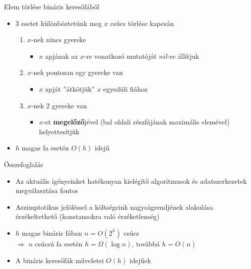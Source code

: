 \documentclass{beamer}
\begin{document}
\begin{frame}{Elem törlése bináris keresőfából}
\pause
	\begin{itemize}
		\item 3 esetet különböztetünk meg $x$ csúcs törlése kapcsán
		\begin{enumerate}
			\item $x$-nek nincs gyereke
			\begin{itemize}
				\item $x$ apjának az $x$-re vonatkozó mutatóját $nil$-re állítjuk
			\end{itemize}
			\item $x$-nek pontosan egy gyereke van
			\begin{itemize}
				\item $x$ apját ''átkötjük'' $x$ egyedüli fiához
			\end{itemize}
			\item $x$-nek 2 gyereke van
			\begin{itemize}
				\item $x$-et \textbf{megelőző}jével (bal oldali részfájának 
				maximális elemével) helyettesítjük
			\end{itemize}
		\end{enumerate}
		\item $h$ magas fa esetén $O(h)$ idejű
	\end{itemize}
\end{frame}

\begin{frame}{Összefoglalás}
	\begin{itemize}
		\item Az aktuális igényeinket hatékonyan kielégítő algoritmusok és 
		adatszerkezetek megválasztása fontos
		\item Aszimptotikus jelöléssel a költségeink nagyságrendjének 
		alakulása érzékeltethető (konstansokra való érzéketlenség)
		\item $h$ magas bináris fában $n=O(2^h)$ csúcs \\
		\pause $\Rightarrow$ $n$ csúcsú fa esetén $h=\Omega(\log n)$, továbbá 
		$h=O(n)$
		\item A bináris keresőfák műveletei $O(h)$ idejűek
	\end{itemize}

\end{frame}
\end{document}
